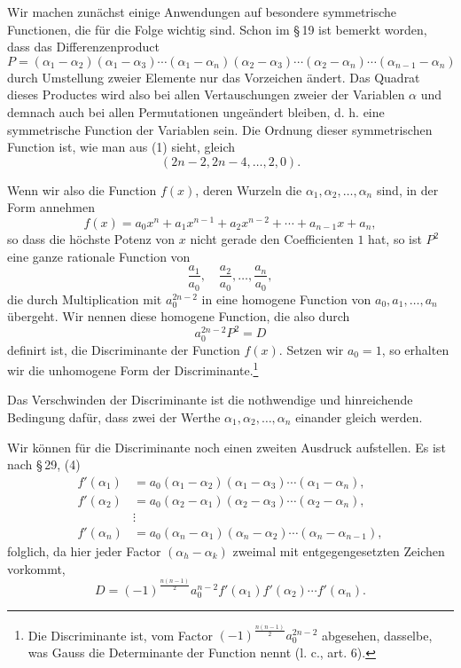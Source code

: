 \documentclass[11pt]{article}
\begin{document}
Wir machen zunächst einige Anwendungen auf besondere symmetrische Functionen, die für die Folge wichtig sind. Schon im \S\,19 ist bemerkt worden, dass das Differenzenproduct
\begin{equation}
 P=(\alpha_1-\alpha_2)(\alpha_1-\alpha_3)\cdots(\alpha_1-\alpha_n)
   (\alpha_2-\alpha_3)\cdots(\alpha_2-\alpha_n)\cdots(\alpha_{n-1}-\alpha_n)
\tag{1}
\end{equation}
durch Umstellung zweier Elemente nur das Vorzeichen ändert. Das Quadrat dieses Productes wird also bei allen Vertauschungen zweier der Variablen \(\alpha\) und demnach auch bei allen Permutationen ungeändert bleiben, d. h. eine symmetrische Function der Variablen sein. Die Ordnung dieser symmetrischen Function ist, wie man aus (1) sieht, gleich
\[
 (2n-2,2n-4,\ldots,2,0).
\]

Wenn wir also die Function \(f(x)\), deren Wurzeln die \(\alpha_1,\alpha_2,\ldots,\alpha_n\) sind, in der Form annehmen
\[
 f(x)=a_0x^n+a_1x^{n-1}+a_2x^{n-2}+\cdots+a_{n-1}x+a_n,
\]
so dass die höchste Potenz von \(x\) nicht gerade den Coefficienten \(1\) hat, so ist \(P^2\) eine ganze rationale Function von
\begin{equation}
 \frac{a_1}{a_0},\quad \frac{a_2}{a_0},\ldots,\frac{a_n}{a_0},
\tag{2}
\end{equation}
die durch Multiplication mit \(a_0^{2n-2}\) in eine homogene Function von \(a_0,a_1,\ldots,a_n\) übergeht. Wir nennen diese homogene Function, die also durch
\begin{equation}
 a_0^{2n-2}P^2=D
\tag{3}
\end{equation}
definirt ist, die Discriminante der Function \(f(x)\). Setzen wir \(a_0=1\), so erhalten wir die unhomogene Form der Discriminante.\footnote{Die Discriminante ist, vom Factor \((-1)^{\frac{n(n-1)}2}a_0^{2n-2}\) abgesehen, dasselbe, was Gauss die Determinante der Function nennt (l. c., art. 6).}

Das Verschwinden der Discriminante ist die nothwendige und hinreichende Bedingung dafür, dass zwei der Werthe \(\alpha_1,\alpha_2,\ldots,\alpha_n\) einander gleich werden.

Wir können für die Discriminante noch einen zweiten Ausdruck aufstellen. Es ist nach \S\,29, (4)
\[
\begin{aligned}
 f'(\alpha_1)&=a_0(\alpha_1-\alpha_2)(\alpha_1-\alpha_3)\cdots(\alpha_1-\alpha_n),\\
 f'(\alpha_2)&=a_0(\alpha_2-\alpha_1)(\alpha_2-\alpha_3)\cdots(\alpha_2-\alpha_n),\\
 &\vdots\\
 f'(\alpha_n)&=a_0(\alpha_n-\alpha_1)(\alpha_n-\alpha_2)\cdots(\alpha_n-\alpha_{n-1}),
\end{aligned}
\]
folglich, da hier jeder Factor \((\alpha_h-\alpha_k)\) zweimal mit entgegengesetzten Zeichen vorkommt,
\begin{equation}
 D=(-1)^{\frac{n(n-1)}2}a_0^{n-2}f'(\alpha_1)f'(\alpha_2)\cdots f'(\alpha_n).
\tag{5}
\end{equation}
\end{document}
